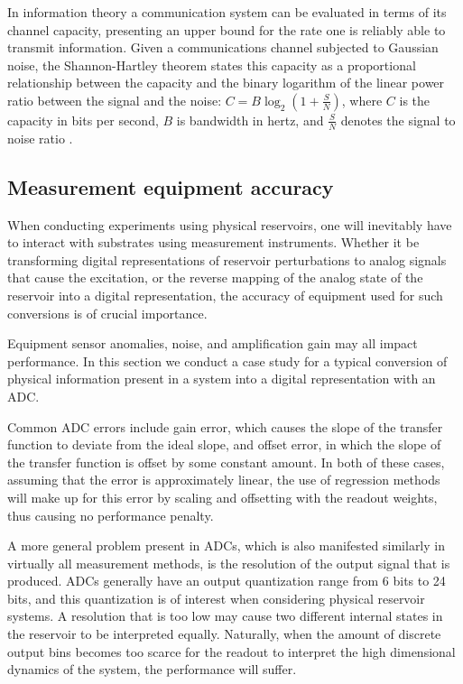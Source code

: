 In information theory a communication system can be evaluated in terms of its
channel capacity, presenting an upper bound for the rate one is reliably able to
transmit information. Given a communications channel subjected to Gaussian
noise, the Shannon-Hartley theorem states this capacity as a proportional
relationship between the capacity and the binary logarithm of the linear power
ratio between the signal and the noise: $C = B\log_2(1 + \frac{S}{N})$, where
$C$ is the capacity in bits per second, $B$ is bandwidth in hertz, and
$\frac{S}{N}$ denotes the signal to noise ratio
\cite{shannon_communication_1949}.

\subsection{Measurement equipment accuracy}

When conducting experiments using physical reservoirs, one will inevitably have
to interact with substrates using measurement instruments. Whether it be
transforming digital representations of reservoir perturbations to analog
signals that cause the excitation, or the reverse mapping of the analog state of
the reservoir into a digital representation, the accuracy of equipment used for
such conversions is of crucial importance.

Equipment sensor anomalies, noise, and amplification gain may all impact
performance. In this section we conduct a case study for a typical conversion of
physical information present in a system into a digital representation with an
ADC.

Common ADC errors include gain error, which causes the slope of the transfer
function to deviate from the ideal slope, and offset error, in which the slope
of the transfer function is offset by some constant amount. In both of these
cases, assuming that the error is approximately linear, the use of regression
methods will make up for this error by scaling and offsetting with the readout
weights, thus causing no performance penalty.

A more general problem present in ADCs, which is also manifested similarly in
virtually all measurement methods, is the resolution of the output signal that
is produced. ADCs generally have an output quantization range from 6 bits to 24
bits, and this quantization is of interest when considering physical reservoir
systems. A resolution that is too low may cause two different internal states in
the reservoir to be interpreted equally. Naturally, when the amount of discrete
output bins becomes too scarce for the readout to interpret the high dimensional
dynamics of the system, the performance will suffer.

